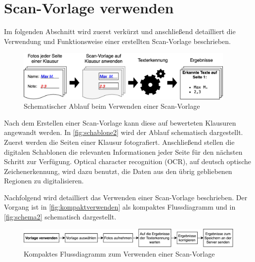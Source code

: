 \documentclass[notables, nomenclature, oneside, 150]{HSMW-Thesis}
\begin{document}
 	\section{Scan-Vorlage verwenden}
 		Im folgenden Abschnitt wird zuerst verkürzt und anschließend detailliert die Verwendung und Funktionsweise einer erstellten Scan-Vorlage beschrieben. 
 	
 		\begin{figure}[h!]
    		\centering
    		\includegraphics[width=0.95\textwidth]{img/schablone2}
    		\caption{Schematischer Ablauf beim Verwenden einer Scan-Vorlage}
    		\label{fig:schablone2}
    	\end{figure}
 
		Nach dem Erstellen einer Scan-Vorlage kann diese auf bewerteten Klausuren angewandt werden. In \autoref{fig:schablone2} wird der Ablauf schematisch dargestellt. Zuerst werden die Seiten einer Klausur fotografiert. Anschließend stellen die digitalen Schablonen die relevanten Informationen jeder Seite für den nächsten Schritt zur Verfügung. Optical character recognition (OCR), auf deutsch optische Zeichenerkennung, wird dazu benutzt, die Daten aus den übrig gebliebenen Regionen zu digitalisieren.
    	
    	Nachfolgend wird detailliert das Verwenden einer Scan-Vorlage beschrieben. Der Vorgang ist in \autoref{fig:kompaktverwenden} als kompaktes Flussdiagramm und in \autoref{fig:schema2} schematisch dargestellt.

    	
    	\begin{figure}[h!]
    		\centering
    		\includegraphics[width=\textwidth]{img/verwenden_flow_small}
    		\caption{Kompaktes Flussdiagramm zum Verwenden einer Scan-Vorlage}
    		\label{fig:kompaktverwenden}
    	\end{figure}
	
\end{document}
